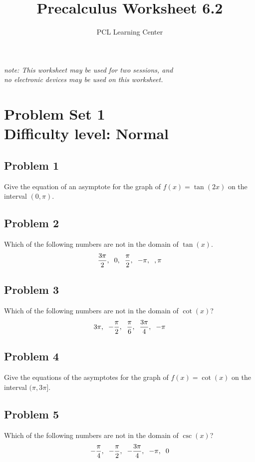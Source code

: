 \documentclass[12pt]{article}
\title{Precalculus Worksheet 6.2}
\author{PCL Learning Center}
\date{}
\begin{document}
\maketitle

\begin{center}
    \textit{note: This worksheet may be used for two sessions, and\\no electronic devices may be used on this worksheet.}
\end{center}

\section*{Problem Set 1\\Difficulty level: Normal}
\subsection*{Problem 1}
Give the equation of an asymptote for the graph of \(f(x)=\tan(2x)\) on the interval \((0,\pi)\).

\subsection*{Problem 2}
Which of the following numbers are not in the domain of \(\tan(x)\).
\[\dfrac{3\pi}{2}, \hspace{0.2cm} 0, \hspace{0.2cm} \dfrac{\pi}{2}, \hspace{0.2cm}-\pi, \hspace{0.2cm}, \pi\]

\subsection*{Problem 3}
Which of the following numbers are not in the domain of \(\cot(x)\)?
\[
3\pi,\hspace{0.2cm}-\dfrac{\pi}{2},\hspace{0.2cm}\dfrac{\pi}{6},\hspace{0.2cm}\dfrac{3\pi}{4},\hspace{0.2cm}-\pi
\]

\subsection*{Problem 4}
Give the equations of the asymptotes for the graph of \(f(x) = \cot(x)\) on the interval \((\pi, 3\pi]\).

\subsection*{Problem 5}
Which of the following numbers are not in the domain of \(\csc(x)\)?
\[
-\dfrac{\pi}{4},\hspace{0.2cm}-\dfrac{\pi}{2},\hspace{0.2cm}-\dfrac{3\pi}{4},\hspace{0.2cm}-\pi,\hspace{0.2cm}0
\]
\end{document}
